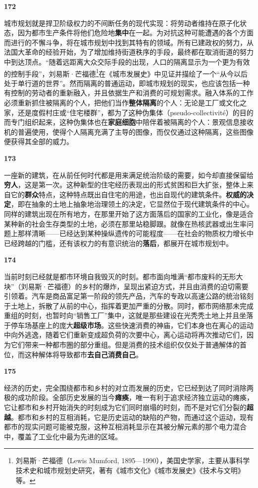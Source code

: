 \documentclass[fontset=fandol, a4paper, 12pt, openright]{ctexbook}
\makeatletter
\newcommand{\thesis}[1]{%
    \par\vspace{1.5em}%
    {\centering \textbf{\Large #1}\par}%
    \nobreak\vspace{0.5em}\nobreak
    \@afterindenttrue %
    \@afterheading    %
}
\makeatother
\begin{document}
\thesis{172}
城市规划就是捍卫阶级权力的不间断任务的现代实现：将劳动者维持在原子化状态，因为都市生产条件将他们危险地\textbf{集中}在一起。为对抗这种可能遭遇的各个方面而进行的不懈斗争，将在城市规划中找到其特有的领域。所有已建政权的努力，从法国大革命的经验开始，为了增加维持街道秩序的手段，最终都在取消街道的努力中到达顶点。“随着远距离大众交际手段的出现，人口的隔离显示为一个更为有效的控制手段”，刘易斯·芒福德\footnote{刘易斯·芒福德（Lewis Mumford, 1895—1990），美国史学家，主要从事科学技术史和城市规划史研究，著有《城市文化》《城市发展史》《技术与文明》等。}在《城市发展史》中见证并描绘了一个“从今以后处于单行道的世界”。然而隔离的普通运动，即城市规划的现实，也应该包括一种有控制的劳动者的重新融入，并且依据生产和消费的可规划需求。融入体系的工作必须重新抓住被隔离的个人，把他们当作\textbf{整体隔离}的个人：无论是工厂或文化之家，还是度假村庄或“住宅楼群”，都为了这种伪集体（pseudo-collectivité）的目的而专门组织起来，这种伪集体也在\textbf{家庭细胞}中陪伴着被隔离的个人：景观信息接收机的普遍使用，使得个人隔离充满了主导的图像，而仅仅通过这种隔离，这些图像便获得其全部的威力。

\thesis{173}
一座新的建筑，在从前任何时代都是用来满足统治阶级的需要，如今却直接保留给\textbf{穷人}，这是第一次。这种新型的住宅经历表现出的形式贫困和巨大扩张，整体上来自它的\textbf{群众}特点，这种特点既出自住宅的用途，也出自现代的建筑条件。\textbf{权威的决定}，即在抽象的土地上抽象地治理领土的决定，它显然位于现代建筑条件的中心。同样的建筑出现在所有地方，在那里开始了这方面落后的国家的工业化，像是适合某种新的社会生存类型的土地，必须在那里站稳脚跟。就像在热核武器或出生率问题上那样清晰——已经达到某种操纵遗传的可能程度——在社会的物质权力增长中已经跨越的门槛，还有该权力的有意识统治的\textbf{落后}，都展开在城市规划中。

\thesis{174}
当前时刻已经就是都市环境自我毁灭的时刻。都市面向堆满“都市废料的无形大块”（刘易斯·芒福德）的乡村的爆炸，呈现出紧迫方式，并且由消费的迫切需要引领着。汽车是商品富足第一阶段的领先产品，汽车的专政以高速公路的统治铭刻于土地上，拆散了从前的中心，指挥着更加严重的分散。同时，都市网络那未完成重组的时刻，也暂时向“销售工厂”集中，这就是那些建设在光秃秃土地上并且坐落于停车场基座上的庞大\textbf{超级市场}。这些快速消费的神庙，它们本身也在离心的运动中向外逃逸，随着它们重新变成超负荷的次要中心，离心运动将再次推动它们，因为它们带来一种都市圈的部分重组。但是消费的技术组织仅仅处于普通解体的首位，而这种解体将导致都市\textbf{去自己消费自己}。

\thesis{175}
经济的历史，完全围绕都市和乡村的对立而发展的历史，它已经到达了同时消除两极的成功阶段。全部历史发展的当今\textbf{瘫痪}，唯一有利于追求经济独立运动的瘫痪，它让都市和乡村开始消失的时刻成为它们同时崩塌的时刻，而不是对它们分裂的\textbf{超越}。都市和乡村的互相消耗，它是历史运动的缺陷的产物，而通过这个运动，现有都市的现实问题可能被克服，这种互相消耗显示在其被分解元素的那个电力混合中，覆盖了工业化中最为先进的区域。
\end{document}
